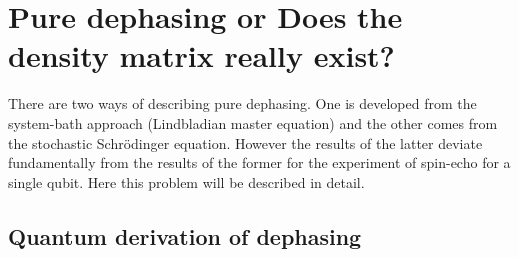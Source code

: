 \documentclass[12pt]{report}
\numberwithin{equation}{section}
\begin{document}
\appendix

\chapter{Pure dephasing or Does the density matrix really exist?}

There are two ways of describing pure dephasing. One is developed from the system-bath approach (Lindbladian master equation) and the other comes from the stochastic Schrödinger equation. However the results of the latter deviate fundamentally from the results of the former for the experiment of spin-echo for a single qubit. Here this problem will be described in detail.

\section{Quantum derivation of dephasing}
\end{document}
